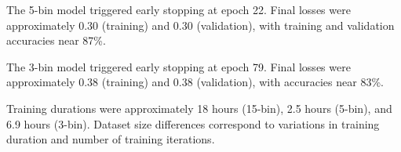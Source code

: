 The 5-bin model triggered early stopping at epoch 22. Final losses were approximately 0.30 (training) and 0.30 (validation), with training and validation accuracies near 87\%.

The 3-bin model triggered early stopping at epoch 79. Final losses were approximately 0.38 (training) and 0.38 (validation), with accuracies near 83\%.

Training durations were approximately 18 hours (15-bin), 2.5 hours (5-bin), and 6.9 hours (3-bin). Dataset size differences correspond to variations in training duration and number of training iterations.








